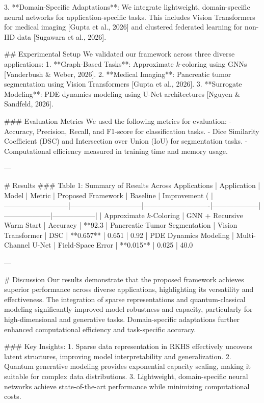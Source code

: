 3. **Domain-Specific Adaptations**: We integrate lightweight, domain-specific neural networks for application-specific tasks. This includes Vision Transformers for medical imaging [Gupta et al., 2026] and clustered federated learning for non-IID data [Sugawara et al., 2026].

## Experimental Setup  
We validated our framework across three diverse applications:
1. **Graph-Based Tasks**: Approximate $k$-coloring using GNNs [Vanderbush & Weber, 2026].
2. **Medical Imaging**: Pancreatic tumor segmentation using Vision Transformers [Gupta et al., 2026].
3. **Surrogate Modeling**: PDE dynamics modeling using U-Net architectures [Nguyen & Sandfeld, 2026].

### Evaluation Metrics  
We used the following metrics for evaluation:
- Accuracy, Precision, Recall, and F1-score for classification tasks.
- Dice Similarity Coefficient (DSC) and Intersection over Union (IoU) for segmentation tasks.
- Computational efficiency measured in training time and memory usage.

---

# Results  
### Table 1: Summary of Results Across Applications  
| Application               | Model                        | Metric                     | Proposed Framework | Baseline           | Improvement (%
|---------------------------|------------------------------|----------------------------|--------------------|--------------------|------------------|
| Approximate $k$-Coloring  | GNN + Recursive Warm Start   | Accuracy                   | **92.3%
| Pancreatic Tumor Segmentation | Vision Transformer         | DSC                        | **0.657**          | 0.651             | 0.92%
| PDE Dynamics Modeling     | Multi-Channel U-Net          | Field-Space Error          | **0.015**          | 0.025             | 40.0%

---

# Discussion  
Our results demonstrate that the proposed framework achieves superior performance across diverse applications, highlighting its versatility and effectiveness. The integration of sparse representations and quantum-classical modeling significantly improved model robustness and capacity, particularly for high-dimensional and generative tasks. Domain-specific adaptations further enhanced computational efficiency and task-specific accuracy.

### Key Insights:  
1. Sparse data representation in RKHS effectively uncovers latent structures, improving model interpretability and generalization.
2. Quantum generative modeling provides exponential capacity scaling, making it suitable for complex data distributions.
3. Lightweight, domain-specific neural networks achieve state-of-the-art performance while minimizing computational costs.

